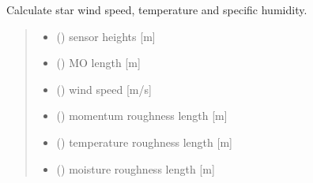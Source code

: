 \documentclass[letterpaper,10pt,english]{sphinxmanual}
\begin{document}

\begin{fulllineitems}
\label{\detokenize{users_guide:AirSeaFluxCode.flux_subs.get_strs}}
\pysigstartsignatures
{}
\pysigstopsignatures
\sphinxAtStartPar
Calculate star wind speed, temperature and specific humidity.
\begin{quote}\begin{description}
\begin{itemize}
\item {} 
\sphinxAtStartPar
{} () \textendash{} sensor heights {[}m{]}

\item {} 
\sphinxAtStartPar
{} () \textendash{} M\sphinxhyphen{}O length     {[}m{]}

\item {} 
\sphinxAtStartPar
{} () \textendash{} wind speed     {[}m/s{]}

\item {} 
\sphinxAtStartPar
{} () \textendash{} momentum roughness length    {[}m{]}

\item {} 
\sphinxAtStartPar
{} () \textendash{} temperature roughness length {[}m{]}

\item {} 
\sphinxAtStartPar
{} () \textendash{} moisture roughness length    {[}m{]}


\end{itemize}
\end{description}
\end{quote}
\end{fulllineitems}
\end{document}
